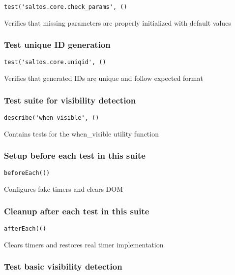 \documentclass[a4paper]{article}
\begin{document}
\begin{lstlisting}
test('saltos.core.check_params', ()
\end{lstlisting}

Verifies that missing parameters are properly initialized with default values

\hypertarget{toc54}{}
\subsubsection{Test unique ID generation}

\begin{lstlisting}
test('saltos.core.uniqid', ()
\end{lstlisting}

Verifies that generated IDs are unique and follow expected format

\hypertarget{toc55}{}
\subsubsection{Test suite for visibility detection}

\begin{lstlisting}
describe('when_visible', ()
\end{lstlisting}

Contains tests for the when\_visible utility function

\hypertarget{toc56}{}
\subsubsection{Setup before each test in this suite}

\begin{lstlisting}
beforeEach(()
\end{lstlisting}

Configures fake timers and clears DOM

\hypertarget{toc57}{}
\subsubsection{Cleanup after each test in this suite}

\begin{lstlisting}
afterEach(()
\end{lstlisting}

Clears timers and restores real timer implementation

\hypertarget{toc58}{}
\subsubsection{Test basic visibility detection}
\end{document}
